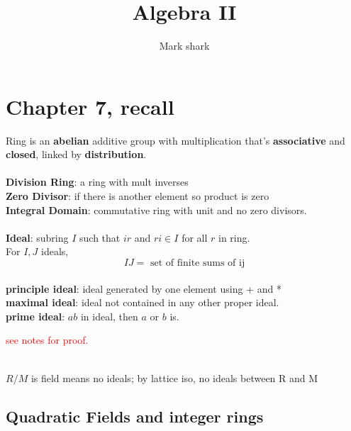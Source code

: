 \documentclass[12pt]{article}
\title{Algebra II}
\author{Mark shark}
\date{}
\begin{document}
\maketitle

\section*{Chapter 7, recall}
Ring is an \textbf{abelian} additive group with multiplication that's \textbf{associative} and \textbf{closed}, linked by \textbf{distribution}.\\

\ \\
\noindent\textbf{Division Ring}: a ring with mult inverses \\
\textbf{Zero Divisor}: if there is another element so product is zero\\
\textbf{Integral Domain}: commutative ring with unit and no zero divisors.\\

\ \\
\textbf{Ideal}: subring $I$ such that $ir$ and $ri \in I$ for all $r$ in ring.\\
For $I, J$ ideals, 
$$IJ = \text{ set of finite sums of ij}$$
\ \\
\textbf{principle ideal}: ideal generated by one element using + and *\\
\textbf{maximal ideal}: ideal not contained in any other proper ideal.\\
\textbf{prime ideal}: $ab$ in ideal, then $a$ or $b$ is.\\

\centerline{
}
\textcolor{red}{see notes for proof.}


\centerline{}\\
\textcolor[gray]{0.5}{$R / M$ is field means no ideals; by lattice iso, no ideals between R and M}\\


\subsection*{Quadratic Fields and integer rings}
\end{document}
